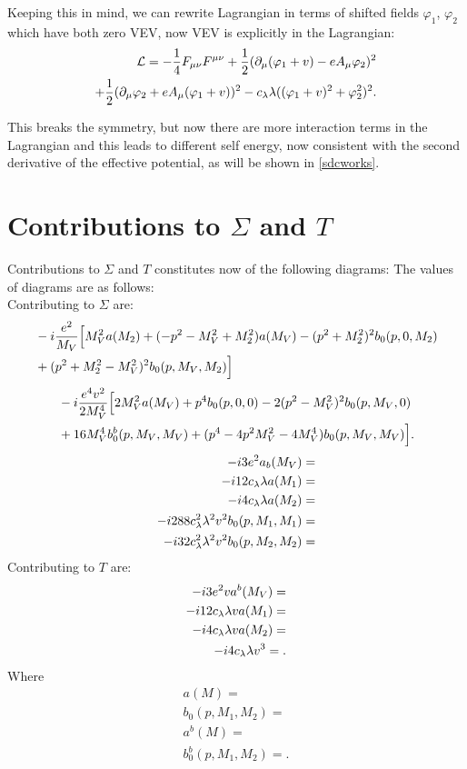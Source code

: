 Keeping this in mind, we can rewrite Lagrangian in terms of shifted fields $\varphi_1$, 
$\varphi_2$ which have both zero VEV, now VEV is explicitly in the Lagrangian:
\begin{align}\label{no_mass_term}
\mathcal{L} = -\frac{1}{4}F_{\mu\nu}F^{\mu\nu}+ 
\frac{1}{2}(\partial_\mu(\varphi_1+v) - eA_\mu\varphi_2)^2\\
+\frac{1}{2}(\partial_\mu\varphi_2+eA_\mu(\varphi_1+v))^2
-c_\lambda\lambda((\varphi_1+v)^2+\varphi_2^2)^2. \notag
\end{align}

This breaks the symmetry, but now there are more interaction terms in the Lagrangian and this leads 
to different self energy, now consistent with the second derivative of the effective potential, 
as will be shown in \ref{sdcworks}.
\section{Contributions to \texorpdfstring{$\Sigma$}{Sigma} and \texorpdfstring{$T$}{T}}
Contributions to $\Sigma$ and $T$ constitutes now of the following diagrams:
The values of diagrams are as follows: \\
Contributing to $\Sigma$ are:
\begin{align}
&-i\frac{e^2}{M_V}\Big[M_V^2a(M_2)+(-p^2-M_V^2+M_2^2)a(M_V)-(p^2+M_2^2)^2b_0(p,0,M_2) 
\notag\\ 
&+(p^2+M_2^2-M_V^2)^2b_0(p,M_V,M_2)\Big]
\end{align}
\begin{align}
&-i\frac{e^4v^2}{2M_V^4}\Big[2M_V^2a(M_V)+p^4b_0(p,0,0)-2(p^2-M_V^2)^2b_0(p,M_V,0)\notag \\
&+16M_V^4b_0^b(p,M_V,M_V)+(p^4-4p^2M_V^2-4M_V^4)b_0(p,M_V,M_V)\Big].
\end{align}
\begin{align}
-i3e^2a_b(M_V) =\\
-i12c_\lambda\lambda a(M_1) =\\
-i4c_\lambda\lambda a(M_2) =\\
-i288c_\lambda^2\lambda^2v^2b_0(p,M_1,M_1) =\\
-i32c_\lambda^2\lambda^2 v^2b_0(p,M_2,M_2) =\\
\end{align}
Contributing to $T$ are:
\begin{align}
-i3e^2va^b(M_V) =\\
-i12c_\lambda\lambda va(M_1) =\\
-i4c_\lambda\lambda va(M_2) =\\
-i4c_\lambda\lambda v^3 =.
\end{align}
Where
\begin{align}
a(M) = \\
b_0(p,M_1,M_2) = \\
a^b(M) = \\
b_0^b(p,M_1,M_2) = .
\end{align}
